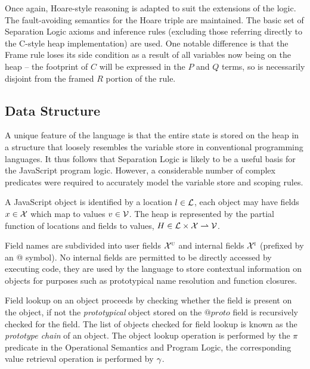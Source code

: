 \documentclass[a4paper,notitlepage]{report}
\begin{document}
  Once again, Hoare-style reasoning is adapted to suit the extensions of the
  logic. The fault-avoiding semantics for the Hoare triple are maintained. The
  basic set of Separation Logic axioms and inference rules (excluding those
  referring directly to the C-style heap implementation) are used. One notable
  difference is that the Frame rule loses its side condition as a result of all
  variables now being on the heap -- the footprint of $C$ will be expressed in
  the $P$ and $Q$ terms, so is necessarily disjoint from the framed $R$ portion of
  the rule.

  \subsection{Data Structure}
  \label{sec:intro:js:datastructure}

  A unique feature of the
  language is that the entire state is stored on the heap in a structure that
  loosely resembles the variable store in conventional programming languages. It
  thus follows that Separation Logic is likely to be a useful basis for the
  JavaScript program logic. However, a considerable number of complex predicates
  were required to accurately model the variable store and scoping rules.


  A JavaScript object is identified by a location $l \in \mathcal{L}$, each object may
  have fields $x \in \mathcal{X}$ which map to values $v \in \mathcal{V}$. The heap is
  represented by the partial function of locations and fields to
  values, $H \in \mathcal{L} \times \mathcal{X} \rightharpoonup \mathcal{V}$.

  Field names are subdivided into user fields $\mathcal{X}^{\textsc{u}}$ and internal fields
  $\mathcal{X}^{\textsc{i}}$ (prefixed by an @ symbol). No internal fields are permitted to be
  directly accessed by executing code, they are used by the language to store
  contextual information on objects for purposes such as prototypical name
  resolution and function closures.

  Field lookup on an object proceeds by checking whether the field is present on
  the object, if not the \emph{prototypical} object stored on the $@proto$ field
  is recursively checked for the field. The list of
  objects checked for field lookup is known as the \emph{prototype chain}
  of an object. The object lookup operation is performed by the $\pi$
  predicate in the Operational Semantics and Program Logic, the corresponding
  value retrieval operation is performed by $\gamma$.
\end{document}
